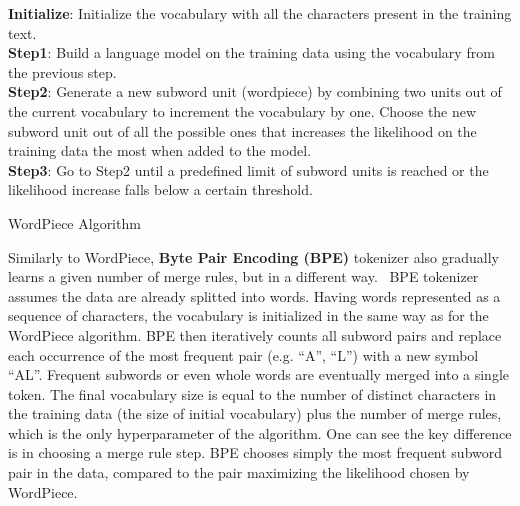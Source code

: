     \begin{algorithm}[]
        \textbf{Initialize}: Initialize the vocabulary with all the characters present in the training text. 
        \\
        \textbf{Step1}: Build a language model on the training data using the vocabulary from the previous step.
        \\
        \textbf{Step2}: Generate a new subword unit (wordpiece) by combining two units out of the current vocabulary to increment the vocabulary by one. Choose the new subword unit out of all the possible ones that increases the likelihood on the training data the most when added to the model.
        \\
        \textbf{Step3}: Go to Step2 until a predefined limit of subword units is reached or the likelihood increase falls below a certain threshold.
     \caption[WordPiece Algorithm]{WordPiece Algorithm~\parencite{wordpiece-tokenizer}}
     \label{alg:wordpiece-tokenizer}
    \end{algorithm}
    
    Similarly to WordPiece, \textbf{Byte Pair Encoding (BPE)} tokenizer also gradually learns a given number of merge rules, but in a different way.~\parencite{BPE-tokenizer} BPE tokenizer assumes the data are already splitted into words. Having words represented as a sequence of characters, the vocabulary is initialized in the same way as for the WordPiece algorithm. BPE then iteratively counts all subword pairs and replace each occurrence of the most frequent pair (e.g. \enquote{A}, \enquote{L}) with a new symbol \enquote{AL}. Frequent subwords or even whole words are eventually merged into a single token. The final vocabulary size is equal to the number of distinct characters in the training data (the size of initial vocabulary) plus the number of merge rules, which is the only hyperparameter of the algorithm. One can see the key difference is in choosing a merge rule step. BPE chooses simply the most frequent subword pair in the data, compared to the pair maximizing the likelihood chosen by WordPiece.
    
